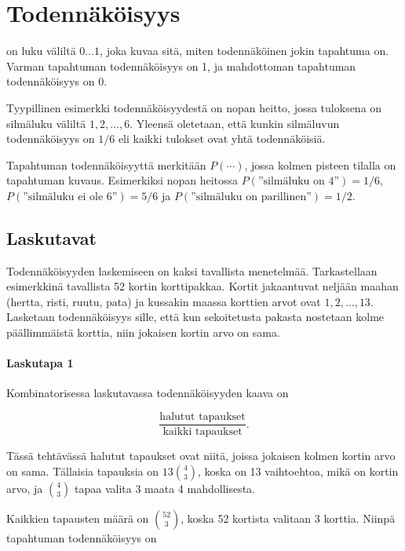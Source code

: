 \chapter{Todennäköisyys}


 on luku väliltä $0 \ldots 1$,
joka kuvaa sitä, miten todennäköinen jokin
tapahtuma on.
Varman tapahtuman todennäköisyys on 1,
ja mahdottoman tapahtuman todennäköisyys on 0.

Tyypillinen esimerkki todennäköisyydestä
on nopan heitto, jossa tuloksena
on silmäluku väliltä $1,2,\ldots,6$.
Yleensä oletetaan, että kunkin silmäluvun
todennäköisyys on $1/6$
eli kaikki tulokset ovat yhtä todennäköisiä.

Tapahtuman todennäköisyyttä merkitään $P(\cdots)$,
jossa kolmen pisteen tilalla on tapahtuman kuvaus.
Esimerkiksi nopan heitossa
$P(\textrm{''silmäluku on 4''})=1/6$,
$P(\textrm{''silmäluku ei ole 6''})=5/6$
ja $P(\textrm{''silmäluku on parillinen''})=1/2$.

\section{Laskutavat}

Todennäköisyyden laskemiseen on kaksi
tavallista menetelmää.
Tarkastellaan esimerkkinä tavallista
52 kortin korttipakkaa.
Kortit jakaantuvat neljään maahan
(hertta, risti, ruutu, pata)
ja kussakin maassa korttien arvot ovat
$1,2,\ldots,13$.
Lasketaan todennäköisyys sille,
että kun sekoitetusta pakasta
nostetaan kolme päällimmäistä korttia,
niin jokaisen kortin arvo on sama.

\subsubsection*{Laskutapa 1}

Kombinatorisessa laskutavassa
todennäköisyyden kaava on

\[\frac{\textrm{halutut tapaukset}}{\textrm{kaikki tapaukset}}.\]

Tässä tehtävässä halutut tapaukset ovat niitä,
joissa jokaisen kolmen kortin arvo on sama.
Tällaisia tapauksia on $13 {4 \choose 3}$,
koska on 13 vaihtoehtoa, mikä on kortin arvo,
ja ${4 \choose 3}$ tapaa valita 3 maata 4 mahdollisesta.

Kaikkien tapausten määrä on ${52 \choose 3}$,
koska 52 kortista valitaan 3 korttia.
Niinpä tapahtuman todennäköisyys on

